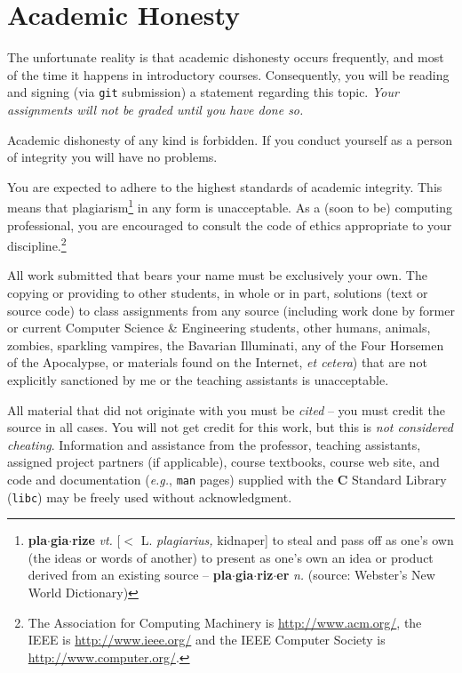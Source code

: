 \documentclass{article}
\begin{document}
\section{Academic Honesty}

The unfortunate reality is that academic dishonesty occurs frequently, and most
of the time it happens in introductory courses. Consequently, you will be
reading and signing (via \texttt{git} submission) a statement regarding this
topic. \emph{Your assignments will not be graded until you have done so.}

Academic dishonesty of any kind is forbidden. If you conduct yourself as a
person of integrity you will have no problems.

You are expected to adhere to the highest standards of academic
integrity.
This means that plagiarism\footnote{{\bf pla$\cdot$gia$\cdot$rize} {\em vt.}
[$<$ L. {\em plagiarius,} kidnaper] to steal and pass off as one's own
(the ideas or words of another) to present as one's own an idea or product
derived from an existing source -- {\bf pla$\cdot$gia$\cdot$riz$\cdot$er}
{\em n.} (source: Webster's New World Dictionary)}
in any form is unacceptable.
As a (soon to be) computing
professional, you are encouraged to consult the code of ethics
appropriate to your discipline.\footnote{The Association for Computing Machinery
is \url{http://www.acm.org/}, the IEEE is
\url{http://www.ieee.org/} and the IEEE Computer
Society is \url{http://www.computer.org/}.}

All work submitted that bears your name must be exclusively your own.
The copying or providing to other students, in whole or in part,
solutions (text or source code) to class assignments from any source
(including work done by former or current Computer Science \& Engineering students,
other humans, animals, zombies, sparkling vampires, the Bavarian Illuminati,
any of the Four Horsemen of the Apocalypse, or materials found
on the Internet, \emph{et cetera}) that are not explicitly sanctioned by me or
the teaching assistants is unacceptable.

All material that did not originate with you must be \emph{cited}
-- you must credit the source in all cases. You will not get credit
for this work, but this is \emph{not considered cheating}. Information and
assistance from the professor, teaching assistants, assigned project partners (if applicable),
course textbooks, course web site, and code and documentation
(\emph{e.g.}, \texttt{man} pages) supplied with the \textbf{C} Standard Library
(\texttt{libc}) may be freely used without acknowledgment.
\end{document}
